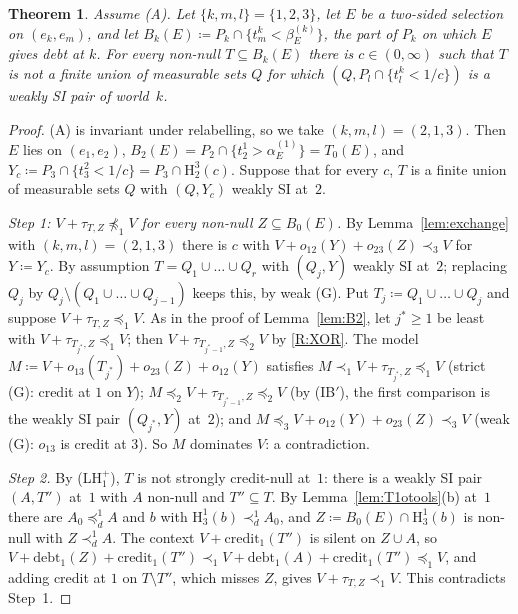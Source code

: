 \documentclass[11pt]{article}
\newtheorem{theorem}{Theorem}
\theoremstyle{definition}\newtheorem{definition}[theorem]{Definition}
\theoremstyle{remark}\newtheorem{remark}[theorem]{Remark}
\newcommand{\debt}{\mathrm{debt}}
\newcommand{\cred}{\mathrm{credit}}
\newcommand{\Hi}[3]{\mathrm H^{#1}_{#2}(#3)}
\begin{document}
\begin{theorem}\label{thm:own}
Assume (A). Let $\{k,m,l\}=\{1,2,3\}$, let $E$ be a two-sided selection on
$(e_k,e_m)$, and let $B_k(E)\coloneqq P_k\cap\{t^k_m<\beta^{(k)}_E\}$, the
part of $P_k$ on which $E$ gives debt at $k$. For every non-null
$T\subseteq B_k(E)$ there is $c\in(0,\infty)$ such that $T$ is not a finite union
of measurable sets $Q$ for which $(Q,P_l\cap\{t^k_l<1/c\})$ is a weakly SI
pair of world~$k$.
\end{theorem}
\begin{proof}
(A) is invariant under relabelling, so we take $(k,m,l)=(2,1,3)$. Then $E$
lies on $(e_1,e_2)$, $B_2(E)=P_2\cap\{t^1_2>\alpha^{(1)}_E\}=T_0(E)$, and
$Y_c\coloneqq P_3\cap\{t^2_3<1/c\}=P_3\cap\Hi32c$. Suppose that for every
$c$, $T$ is a finite union of measurable sets $Q$ with $(Q,Y_c)$ weakly SI
at~$2$.

\emph{Step 1: $V+\tau_{T,Z}\not\preceq_1V$ for every non-null
$Z\subseteq B_0(E)$.} By Lemma~\ref{lem:exchange} with $(k,m,l)=(2,1,3)$
there is $c$ with $V+o_{12}(Y)+o_{23}(Z)\prec_3V$ for $Y\coloneqq Y_c$. By
assumption $T=Q_1\cup\dots\cup Q_r$ with $(Q_j,Y)$ weakly SI at~$2$;
replacing $Q_j$ by $Q_j\setminus(Q_1\cup\dots\cup Q_{j-1})$ keeps this, by
weak (G). Put $T_j\coloneqq Q_1\cup\dots\cup Q_j$ and suppose
$V+\tau_{T,Z}\preceq_1V$. As in the proof of Lemma~\ref{lem:B2}, let
$j^*\ge1$ be least with $V+\tau_{T_{j^*},Z}\preceq_1V$; then
$V+\tau_{T_{j^*-1},Z}\preceq_2V$ by \ref{R:XOR}. The model
$M\coloneqq V+o_{13}(T_{j^*})+o_{23}(Z)+o_{12}(Y)$ satisfies
$M\prec_1V+\tau_{T_{j^*},Z}\preceq_1V$ (strict (G): credit at $1$ on $Y$);
$M\preceq_2V+\tau_{T_{j^*-1},Z}\preceq_2V$ (by (IB$'$), the first comparison
is the weakly SI pair $(Q_{j^*},Y)$ at~$2$); and
$M\preceq_3V+o_{12}(Y)+o_{23}(Z)\prec_3V$ (weak (G): $o_{13}$ is credit at
$3$). So $M$ dominates $V$: a contradiction.

\emph{Step 2.} By (LH$^+_1$), $T$ is not strongly credit-null at~$1$: there
is a weakly SI pair $(A,T'')$ at~$1$ with $A$ non-null and $T''\subseteq T$.
By Lemma~\ref{lem:T1otools}(b) at~$1$ there are $A_0\preceq^1_dA$ and $b$
with $\Hi13b\prec^1_dA_0$, and $Z\coloneqq B_0(E)\cap\Hi13b$ is non-null
with $Z\prec^1_dA$. The context $V+\cred_1(T'')$ is silent on $Z\cup A$, so
$V+\debt_1(Z)+\cred_1(T'')\prec_1V+\debt_1(A)+\cred_1(T'')\preceq_1V$, and
adding credit at $1$ on $T\setminus T''$, which misses $Z$, gives
$V+\tau_{T,Z}\prec_1V$. This contradicts Step~1.
\end{proof}
\end{document}
